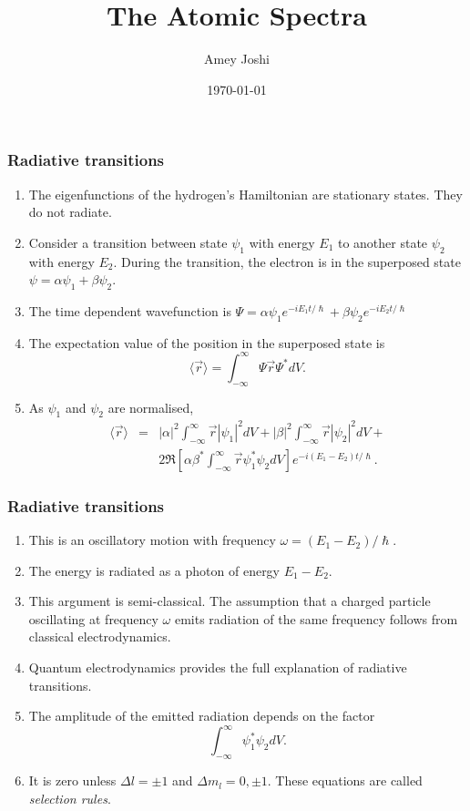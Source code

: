 \documentclass{beamer}
\title{The Atomic Spectra}
\author{Amey Joshi}
\date{\today}
\begin{document}
\begin{frame}
\titlepage
\end{frame}

\begin{frame}
\frametitle{Radiative transitions}
\begin{enumerate}
\item The eigenfunctions of the hydrogen's Hamiltonian are stationary states.
They do not radiate.
\item Consider a transition between state $\psi_1$ with energy $E_1$ to another
state $\psi_2$ with energy $E_2$. During the transition, the electron is in the
superposed state $\psi = \alpha\psi_1 + \beta\psi_2$.
\item The time dependent wavefunction is $\Psi = \alpha\psi_1 e^{-iE_1t/\hslash}
+ \beta\psi_2 e^{-iE_2t/\hslash}$
\item The expectation value of the position in the superposed state is
\begin{equation}\label{e1}
\langle\vec{r}\rangle = \int_{-\infty}^\infty \Psi\vec{r}\Psi^\ast dV.
\end{equation}
\item As $\psi_1$ and $\psi_2$ are normalised,
\begin{eqnarray}
\langle\vec{r}\rangle &=& |\alpha|^2\int_{-\infty}^{\infty}\vec{r}|\psi_1|^2dV +
|\beta|^2\int_{-\infty}^{\infty}\vec{r}|\psi_2|^2dV + \nonumber \\
 & & 2\Re\left[\alpha\beta^\ast
\int_{-\infty}^\infty\vec{r}\psi_1^\ast\psi_2 dV\right]e^{-i(E_1 - E_2)t/\hslash} 
\label{e2}.
\end{eqnarray}
\end{enumerate}
\end{frame}

\begin{frame}
\frametitle{Radiative transitions}
\begin{enumerate}
\item This is an oscillatory motion with frequency $\omega = (E_1-E_2)/\hslash$.
\item The energy is radiated as a photon of energy $E_1 - E_2$.
\item This argument is semi-classical. The assumption that a charged particle
oscillating at frequency $\omega$ emits radiation of the same frequency follows
from classical electrodynamics.
\item Quantum electrodynamics provides the full explanation of radiative 
transitions.
\item The amplitude of the emitted radiation depends on the factor
\begin{equation}\label{e3}
\int_{-\infty}^\infty\psi_1^\ast\psi_2 dV.
\end{equation}
\item It is zero unless $\Delta l = \pm 1$ and $\Delta m_l = 0, \pm 1$. These
equations are called \emph{selection rules}.
\end{enumerate}
\end{frame}
\end{document}
